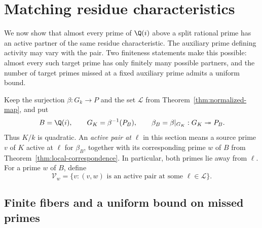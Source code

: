 \section{Matching residue characteristics}\label{sec:matching}

We now show that almost every prime of $\Q(i)$ above a split rational prime has an active partner of the same residue characteristic. The auxiliary prime defining activity may vary with the pair. Two finiteness statements make this possible: almost every such target prime has only finitely many possible partners, and the number of target primes missed at a fixed auxiliary prime admits a uniform bound.

Keep the surjection $\beta:G_k\to P$ and the set $\mathcal L$ from Theorem~\ref{thm:normalized-map}, and put
\[
 B=\Q(i),\qquad G_K=\beta^{-1}(P_B),\qquad
 \beta_B=\beta|_{G_K}:G_K\twoheadrightarrow P_B.
\]
Thus $K/k$ is quadratic. An \emph{active pair at $\ell$} in this section means a source prime $v$ of $K$ active at $\ell$ for $\beta_B$, together with its corresponding prime $w$ of $B$ from Theorem~\ref{thm:local-correspondence}. In particular, both primes lie away from $\ell$. For a prime $w$ of $B$, define
\[
 \mathcal V_w=
 \{v:\text{$(v,w)$ is an active pair at some $\ell\in\mathcal L$}\}.
\]

\subsection{Finite fibers and a uniform bound on missed primes}

